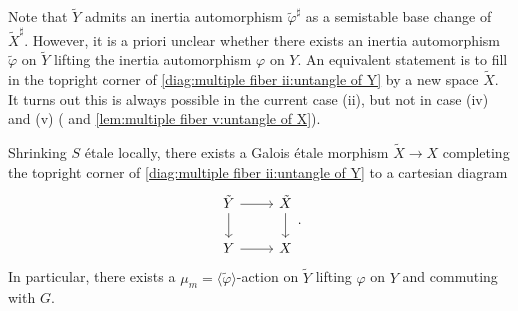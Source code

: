 \documentclass[reqno, letterpaper]{amsart}
\numberwithin{equation}{subsection}
\let\to\longrightarrow
\begin{document}
		Note that $\tilde Y$ admits an inertia automorphism $\tilde \varphi^\sharp$ as a semistable base change of $\tilde X^\sharp$. However, it is a priori unclear whether there exists an inertia automorphism $\tilde \varphi$ on $\tilde Y$ lifting the inertia automorphism $\varphi$ on $Y$. An equivalent statement is to fill in the topright corner of \eqref{diag:multiple fiber ii:untangle of Y} by a new space $\tilde X$. It turns out this is always possible in the current case (ii), but not in case (iv) and (v) ( and \ref{lem:multiple fiber v:untangle of X}).
		
		\begin{lemma} \label{lem:multiple fiber ii:untangle of X}
			Shrinking $S$ \'etale locally, there exists a Galois \'etale morphism $\tilde X \to X$ completing the topright corner of \eqref{diag:multiple fiber ii:untangle of Y} to a cartesian diagram
			\[\begin{tikzcd}
				\tilde Y \arrow[r] \arrow[d] & \tilde X \arrow[d] \\
				Y \arrow[r] & X
			\end{tikzcd}.\]
			In particular, there exists a $\mu_m = \langle \tilde \varphi \rangle$-action on $\tilde Y$ lifting $\varphi$ on $Y$ and commuting with $G$.
		\end{lemma}
\end{document}
